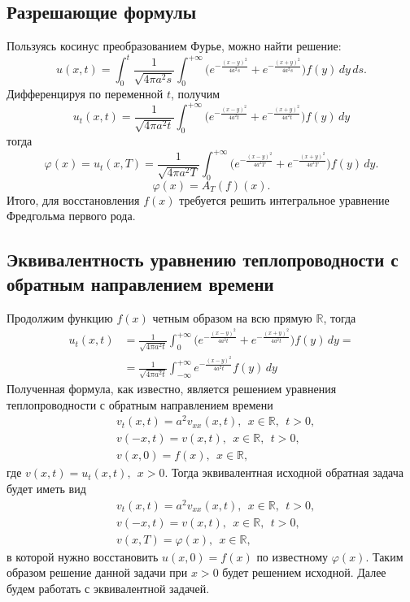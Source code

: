 \documentclass[12pt]{article} %
\begin{document}
\subsection{Разрешающие формулы}
Пользуясь косинус преобразованием Фурье, можно найти решение:
$$u(x, t) = \int_{0}^{t}\frac{1}{\sqrt{4\pi a^2 s}}\int_{0}^{+\infty}\bigg(e^{-\frac{(x - y)^2}{4a^2s}} + e^{-\frac{(x + y)^2}{4a^2s}}\bigg)f(y) \, dy \, ds.$$
Дифференцируя по переменной $t$, получим
$$u_t(x, t) = \frac{1}{\sqrt{4\pi a^2 t}}\int_{0}^{+\infty}\bigg(e^{-\frac{(x - y)^2}{4a^2t}} + e^{-\frac{(x + y)^2}{4a^2t}}\bigg)f(y) \, dy$$
тогда
$$\varphi(x) = u_t(x, T) = \frac{1}{\sqrt{4\pi a^2 T}}\int_{0}^{+\infty}\bigg(e^{-\frac{(x - y)^2}{4a^2T}} + e^{-\frac{(x + y)^2}{4a^2T}}\bigg)f(y) \, dy.$$
$$\varphi(x) = A_T(f)(x).$$
Итого, для восстановления $f(x)$ требуется решить интегральное уравнение Фредгольма первого рода.



\subsection{Эквивалентность уравнению теплопроводности с обратным направлением времени}
Продолжим функцию $f(x)$ четным образом на всю прямую $\mathbb{R}$, тогда 
\begin{align*}
        u_t(x, t) &= \frac{1}{\sqrt{4\pi a^2 t}}\int_{0}^{+\infty}\bigg(e^{-\frac{(x - y)^2}{4a^2t}} + e^{-\frac{(x + y)^2}{4a^2t}}\bigg)f(y) \, dy = \\
                  &= \frac{1}{\sqrt{4\pi a^2 t}}\int_{-\infty}^{+\infty}e^{-\frac{(x - y)^2}{4a^2t}}f(y) \, dy
\end{align*}
Полученная формула, как известно, является решением уравнения теплопроводности с обратным направлением времени
\begin{align*}
        &v_t(x, t)= a^2v_{xx}(x, t), \ \ x  \in \mathbb{R}, \ \ t > 0, \\
        &v(-x, t) = v(x, t), \ \ x  \in \mathbb{R}, \ \  t > 0,\\
        &v(x, 0) = f(x), \ \ x  \in \mathbb{R}, 
\end{align*}
где $v(x, t) = u_t(x, t), \ \ x > 0$.
Тогда эквивалентная исходной обратная задача будет иметь вид
\begin{align*}
        &v_t(x, t)= a^2v_{xx}(x, t), \ \ x  \in \mathbb{R}, \ \ t > 0, \\
        &v(-x, t) = v(x, t), \ \ x  \in \mathbb{R}, \ \  t > 0,\\
        &v(x, T) = \varphi(x), \ \ x  \in \mathbb{R}, 
\end{align*}
в которой нужно восстановить $u(x, 0) = f(x)$ по известному $\varphi(x)$. 
Таким образом решение данной задачи при $x > 0$ будет решением исходной.
Далее будем работать с эквивалентной задачей.
\end{document}
